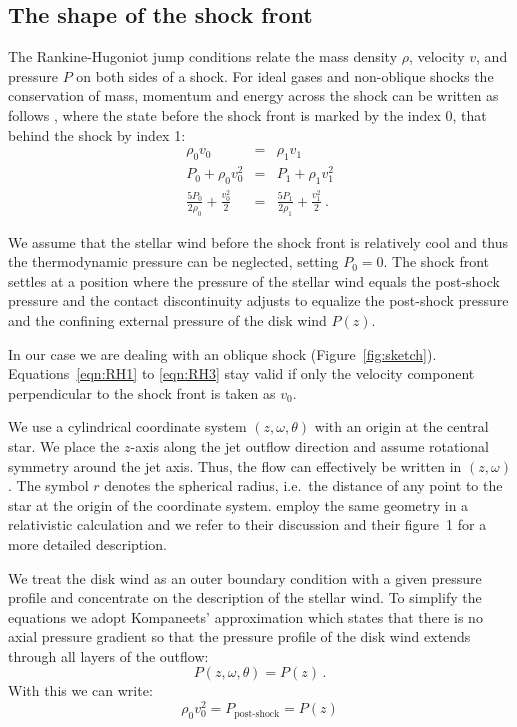 \documentclass{emulateapj}
\begin{document}
\subsection{The shape of the shock front}
\label{sect:model}
The Rankine-Hugoniot jump conditions relate the mass density $\rho$, velocity $v$, and pressure $P$ on both sides of a shock. For ideal gases and non-oblique shocks the conservation of mass, momentum and energy across the shock can be written as follows \citep[][chap.~7]{1967pswh.book.....Z}, where the state before the shock front is marked by the index 0, that behind the shock by index 1:
\begin{eqnarray}
\rho_0 v_0 & = & \rho_1 v_1 \label{eqn:RH1}\\
\label{eqn:RH2}P_0+\rho_0 v_0^2 & = & P_1+\rho_1 v_1^2\\
\label{eqn:RH3}\frac{5 P_0}{2\rho_0}+\frac{v_0^2}{2}& = &\frac{5 P_1}{2\rho_1}+\frac{v_1^2}{2} \ .
\end{eqnarray}

We assume that the stellar wind before the shock front is relatively cool and thus the thermodynamic pressure can be neglected, setting $P_0=0$.
The shock front settles at a position where the pressure of the stellar wind equals the post-shock pressure and the contact discontinuity adjusts to equalize the post-shock pressure and the confining external pressure of the disk wind $P(z)$. 

In our case we are dealing with an oblique shock (Figure~\ref{fig:sketch}). Equations~\ref{eqn:RH1} to \ref{eqn:RH3} stay valid if only the velocity component perpendicular to the shock front is taken as $v_0$. 

We use a cylindrical coordinate system $(z, \omega, \theta)$ with an origin at the central star. We place the $z$-axis along the jet outflow direction and assume rotational symmetry around the jet axis. Thus, the flow can effectively be written in $(z,\omega)$. The symbol $r$ denotes the spherical radius, i.e.\ the distance of any point to the star at the origin of the coordinate system. 
\citet{2012MNRAS.422.2282K} employ the same geometry in a relativistic calculation and we refer to their discussion and their figure~1 for a more detailed description.

We treat the disk wind as an outer boundary condition with a given pressure profile and concentrate on the description of the stellar wind. To simplify the equations we adopt Kompaneets' approximation \citep{1960SPhD....5...46K} which states that there is no axial pressure gradient so that the pressure profile of the disk wind extends through all layers of the outflow:
\begin{equation}
P(z, \omega, \theta) = P(z)\,.
\end{equation}
With this we can write:
\begin{equation}\label{eqn:Pofz}
\rho_0 v_0^2 = P_{\textrm{post-shock}} = P(z)
\end{equation}
\end{document}
